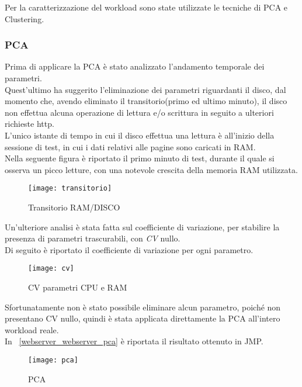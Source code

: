 Per la caratterizzazione del workload sono state utilizzate le tecniche di PCA e
Clustering.\\
\clearpage
\subsubsection{PCA}
Prima di applicare la PCA è stato analizzato l'andamento temporale dei parametri.\\
Quest'ultimo ha suggerito l'eliminazione dei parametri riguardanti il disco, dal
momento che, avendo eliminato il transitorio(primo ed ultimo minuto), il disco
non effettua alcuna operazione di lettura e/o scrittura in seguito a ulteriori
richieste http.\\
L'unico istante di tempo in cui il disco effettua una lettura è all'inizio
della sessione di test, in cui i dati relativi alle pagine sono caricati in RAM.\\
Nella seguente figura è riportato il primo minuto di test,
durante il quale si osserva un picco letture, con una notevole crescita della
memoria RAM utilizzata.\\

\begin{figure}[!htbp]
  \centering
  \texttt{[image: transitorio]}
  \caption{Transitorio RAM/DISCO}
  \label{webserver_transitorio}
\end{figure}

\clearpage

Un'ulteriore analisi è stata fatta sul coefficiente di variazione,
per stabilire la presenza di parametri trascurabili, con \textit{CV} nullo.\\
Di seguito è riportato il coefficiente di variazione per ogni parametro.\\

\begin{figure}[!htbp]
  \centering
  \texttt{[image: cv]}
  \caption{CV parametri CPU e RAM}
  \label{webserver_cv1}
\end{figure}
\clearpage
Sfortunatamente non è stato possibile eliminare alcun parametro, poiché non
presentano CV nullo, quindi è stata applicata direttamente la PCA all'intero
workload reale.\\
In \figurename~\ref{webserver_webserver_pca} è riportata il risultato ottenuto in JMP.\\

\begin{figure}[!htbp]
  \centering
  \texttt{[image: pca]}
  \caption{PCA}
  \label{webserver_pca}
\end{figure}

